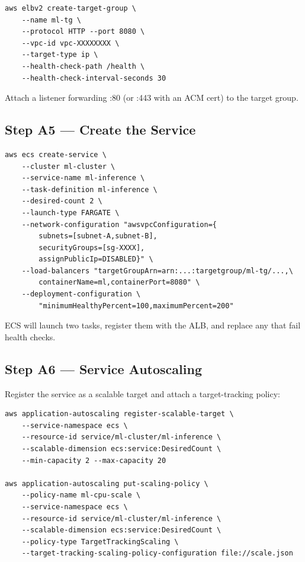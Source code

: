 \documentclass[11pt,a4paper]{article}
\begin{document}
\begin{lstlisting}[style=bashcode]
aws elbv2 create-target-group \
    --name ml-tg \
    --protocol HTTP --port 8080 \
    --vpc-id vpc-XXXXXXXX \
    --target-type ip \
    --health-check-path /health \
    --health-check-interval-seconds 30
\end{lstlisting}

Attach a listener forwarding :80 (or :443 with an ACM cert) to the target group.

\subsection{Step A5 --- Create the Service}

\begin{lstlisting}[style=bashcode]
aws ecs create-service \
    --cluster ml-cluster \
    --service-name ml-inference \
    --task-definition ml-inference \
    --desired-count 2 \
    --launch-type FARGATE \
    --network-configuration "awsvpcConfiguration={
        subnets=[subnet-A,subnet-B],
        securityGroups=[sg-XXXX],
        assignPublicIp=DISABLED}" \
    --load-balancers "targetGroupArn=arn:...:targetgroup/ml-tg/...,\
        containerName=ml,containerPort=8080" \
    --deployment-configuration \
        "minimumHealthyPercent=100,maximumPercent=200"
\end{lstlisting}

ECS will launch two tasks, register them with the ALB, and replace any that
fail health checks.

\subsection{Step A6 --- Service Autoscaling}

Register the service as a scalable target and attach a target-tracking policy:

\begin{lstlisting}[style=bashcode]
aws application-autoscaling register-scalable-target \
    --service-namespace ecs \
    --resource-id service/ml-cluster/ml-inference \
    --scalable-dimension ecs:service:DesiredCount \
    --min-capacity 2 --max-capacity 20

aws application-autoscaling put-scaling-policy \
    --policy-name ml-cpu-scale \
    --service-namespace ecs \
    --resource-id service/ml-cluster/ml-inference \
    --scalable-dimension ecs:service:DesiredCount \
    --policy-type TargetTrackingScaling \
    --target-tracking-scaling-policy-configuration file://scale.json
\end{lstlisting}
\end{document}
